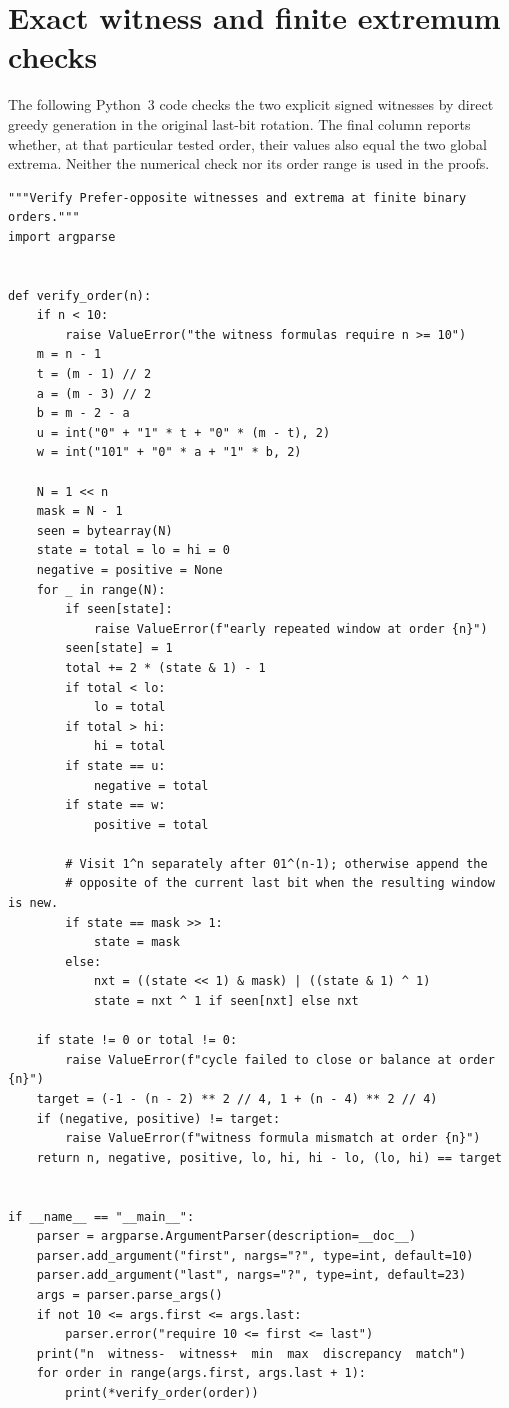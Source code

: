 \documentclass[11pt]{article}
\begin{document}
\section{Exact witness and finite extremum checks}
The following Python~3 code checks the two explicit signed witnesses
by direct greedy generation in the original last-bit rotation.
The final column reports whether, at that particular tested order,
their values also equal the two global extrema. Neither the numerical
check nor its order range is used in the proofs.
{\small
\begin{verbatim}
"""Verify Prefer-opposite witnesses and extrema at finite binary orders."""
import argparse


def verify_order(n):
    if n < 10:
        raise ValueError("the witness formulas require n >= 10")
    m = n - 1
    t = (m - 1) // 2
    a = (m - 3) // 2
    b = m - 2 - a
    u = int("0" + "1" * t + "0" * (m - t), 2)
    w = int("101" + "0" * a + "1" * b, 2)

    N = 1 << n
    mask = N - 1
    seen = bytearray(N)
    state = total = lo = hi = 0
    negative = positive = None
    for _ in range(N):
        if seen[state]:
            raise ValueError(f"early repeated window at order {n}")
        seen[state] = 1
        total += 2 * (state & 1) - 1
        if total < lo:
            lo = total
        if total > hi:
            hi = total
        if state == u:
            negative = total
        if state == w:
            positive = total

        # Visit 1^n separately after 01^(n-1); otherwise append the
        # opposite of the current last bit when the resulting window is new.
        if state == mask >> 1:
            state = mask
        else:
            nxt = ((state << 1) & mask) | ((state & 1) ^ 1)
            state = nxt ^ 1 if seen[nxt] else nxt

    if state != 0 or total != 0:
        raise ValueError(f"cycle failed to close or balance at order {n}")
    target = (-1 - (n - 2) ** 2 // 4, 1 + (n - 4) ** 2 // 4)
    if (negative, positive) != target:
        raise ValueError(f"witness formula mismatch at order {n}")
    return n, negative, positive, lo, hi, hi - lo, (lo, hi) == target


if __name__ == "__main__":
    parser = argparse.ArgumentParser(description=__doc__)
    parser.add_argument("first", nargs="?", type=int, default=10)
    parser.add_argument("last", nargs="?", type=int, default=23)
    args = parser.parse_args()
    if not 10 <= args.first <= args.last:
        parser.error("require 10 <= first <= last")
    print("n  witness-  witness+  min  max  discrepancy  match")
    for order in range(args.first, args.last + 1):
        print(*verify_order(order))
\end{verbatim}
}
\end{document}
